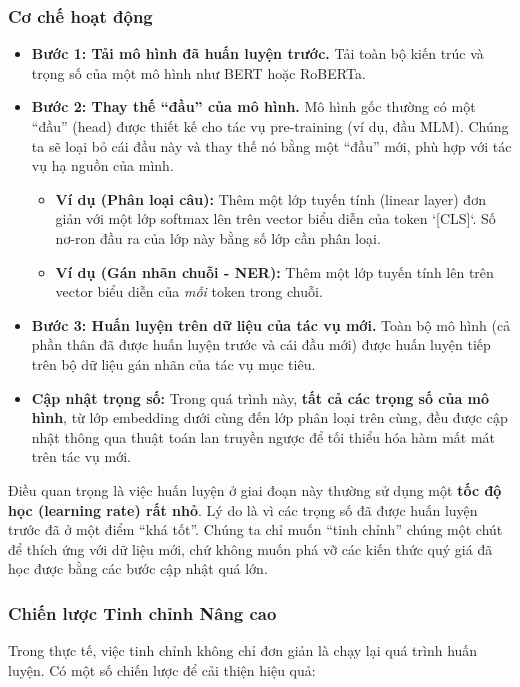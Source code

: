 \subsubsection{Cơ chế hoạt động}
\begin{itemize}
    \item \textbf{Bước 1: Tải mô hình đã huấn luyện trước.} Tải toàn bộ kiến trúc và trọng số của một mô hình như BERT hoặc RoBERTa.
    \item \textbf{Bước 2: Thay thế “đầu” của mô hình.} Mô hình gốc thường có một “đầu” (head) được thiết kế cho tác vụ pre-training (ví dụ, đầu MLM). Chúng ta sẽ loại bỏ cái đầu này và thay thế nó bằng một “đầu” mới, phù hợp với tác vụ hạ nguồn của mình.
        \begin{itemize}
            \item \textbf{Ví dụ (Phân loại câu):} Thêm một lớp tuyến tính (linear layer) đơn giản với một lớp softmax lên trên vector biểu diễn của token `[CLS]`. Số nơ-ron đầu ra của lớp này bằng số lớp cần phân loại.
            \item \textbf{Ví dụ (Gán nhãn chuỗi - NER):} Thêm một lớp tuyến tính lên trên vector biểu diễn của \textit{mỗi} token trong chuỗi.
        \end{itemize}
    \item \textbf{Bước 3: Huấn luyện trên dữ liệu của tác vụ mới.} Toàn bộ mô hình (cả phần thân đã được huấn luyện trước và cái đầu mới) được huấn luyện tiếp trên bộ dữ liệu gán nhãn của tác vụ mục tiêu.
    \item \textbf{Cập nhật trọng số:} Trong quá trình này, \textbf{tất cả các trọng số của mô hình}, từ lớp embedding dưới cùng đến lớp phân loại trên cùng, đều được cập nhật thông qua thuật toán lan truyền ngược để tối thiểu hóa hàm mất mát trên tác vụ mới.
\end{itemize}
Điều quan trọng là việc huấn luyện ở giai đoạn này thường sử dụng một \textbf{tốc độ học (learning rate) rất nhỏ}. Lý do là vì các trọng số đã được huấn luyện trước đã ở một điểm “khá tốt”. Chúng ta chỉ muốn “tinh chỉnh” chúng một chút để thích ứng với dữ liệu mới, chứ không muốn phá vỡ các kiến thức quý giá đã học được bằng các bước cập nhật quá lớn.

\subsubsection{Chiến lược Tinh chỉnh Nâng cao}
Trong thực tế, việc tinh chỉnh không chỉ đơn giản là chạy lại quá trình huấn luyện. Có một số chiến lược để cải thiện hiệu quả:
